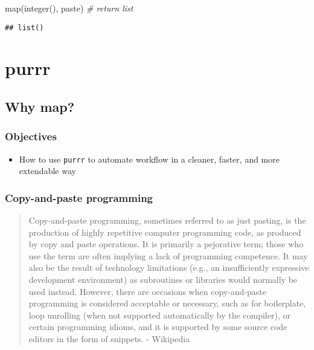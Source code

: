\documentclass[
]{book}
\newenvironment{Shaded}{\begin{snugshade}}{\end{snugshade}}
\newcommand{\CommentTok}[1]{\textcolor[rgb]{0.56,0.35,0.01}{\textit{#1}}}
\newcommand{\FunctionTok}[1]{\textcolor[rgb]{0.00,0.00,0.00}{#1}}
\newcommand{\NormalTok}[1]{#1}
\providecommand{\tightlist}{%
  \setlength{\itemsep}{0pt}\setlength{\parskip}{0pt}}
\begin{document}
\begin{Shaded}
\begin{Highlighting}[]
\FunctionTok{map}\NormalTok{(}\FunctionTok{integer}\NormalTok{(), paste) }\CommentTok{\# return list}
\end{Highlighting}
\end{Shaded}

\begin{verbatim}
## list()
\end{verbatim}

\hypertarget{purrr}{%
\section{purrr}\label{purrr}}

\hypertarget{why-map}{%
\subsection{Why map?}\label{why-map}}

\hypertarget{objectives-1}{%
\subsubsection{Objectives}\label{objectives-1}}

\begin{itemize}
\tightlist
\item
  How to use \texttt{purrr} to automate workflow in a cleaner, faster, and more extendable way
\end{itemize}

\hypertarget{copy-and-paste-programming}{%
\subsubsection{Copy-and-paste programming}\label{copy-and-paste-programming}}

\begin{quote}
Copy-and-paste programming, sometimes referred to as just pasting, is the production of highly repetitive computer programming code, as produced by copy and paste operations. It is primarily a pejorative term; those who use the term are often implying a lack of programming competence. It may also be the result of technology limitations (e.g., an insufficiently expressive development environment) as subroutines or libraries would normally be used instead. However, there are occasions when copy-and-paste programming is considered acceptable or necessary, such as for boilerplate, loop unrolling (when not supported automatically by the compiler), or certain programming idioms, and it is supported by some source code editors in the form of snippets. - Wikipedia
\end{quote}
\end{document}
